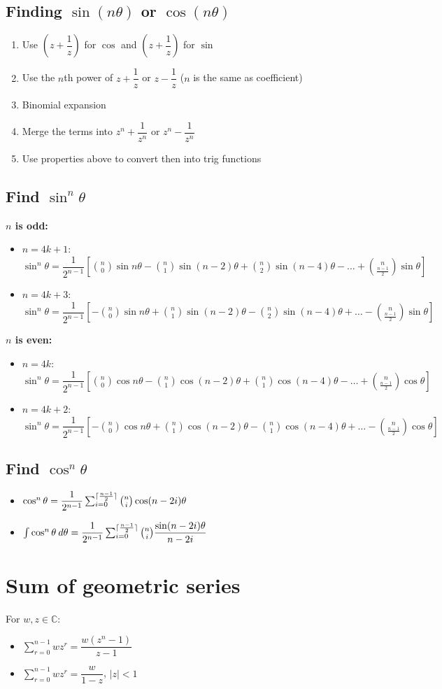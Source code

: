 \subsection{Finding $\sin (n\theta)$ or $\cos (n\theta)$}
\begin{enumerate}
    \item Use $\left(z+\dfrac{1}{z}\right)$ for $\cos$ and $\left(z+\dfrac{1}{z}\right)$ for $\sin$
    \item Use the $n$th power of $z+\dfrac{1}{z}$ or $z-\dfrac{1}{z}$ ($n$ is the same as coefficient)
    \item Binomial expansion
    \item Merge the terms into $z^n+\dfrac{1}{z^n}$ or $z^n-\dfrac{1}{z^n}$
    \item Use properties above to convert then into trig functions
\end{enumerate}
\subsection{Find $\sin^n\theta$}
\textbf{$n$ is odd:}
\begin{itemize}
    \item $n=4k+1$: $\sin^n\theta=\dfrac{1}{2^{n-1}}\left[\binom{n}{0}\sin n\theta - \binom{n}{1}\sin (n-2)\theta + \binom{n}{2}\sin (n-4)\theta - \dots + \binom{n}{\frac{n-1}{2}}\sin \theta\right]$
    \item $n=4k+3$: $\sin^n\theta=\dfrac{1}{2^{n-1}}\left[-\binom{n}{0}\sin n\theta + \binom{n}{1}\sin (n-2)\theta - \binom{n}{2}\sin (n-4)\theta + \dots - \binom{n}{\frac{n-1}{2}}\sin \theta\right]$
\end{itemize}
\textbf{$n$ is even:}
\begin{itemize}
    \item $n=4k$: $\sin^n\theta=\dfrac{1}{2^{n-1}}\left[\binom{n}{0}\cos n\theta - \binom{n}{1}\cos (n-2)\theta + \binom{n}{1}\cos (n-4)\theta - \dots + \binom{n}{\frac{n-1}{2}}\cos \theta\right]$
    \item $n=4k+2$: $\sin^n\theta=\dfrac{1}{2^{n-1}}\left[-\binom{n}{0}\cos n\theta + \binom{n}{1}\cos (n-2)\theta - \binom{n}{1}\cos (n-4)\theta + \dots - \binom{n}{\frac{n-1}{2}}\cos \theta\right]$
\end{itemize}
\subsection{Find $\cos^n\theta$}
\begin{itemize}
    \item $\cos^n\theta = \dfrac{1}{2^{n-1}}\sum_{i=0}^{\lceil\frac{n-1}{2}\rceil} \binom{n}{i}\cos (n-2i)\theta$
    \item $\int \cos^n\theta \: d\theta = \dfrac{1}{2^{n-1}} \sum_{i=0}^{\lceil\frac{n-1}{2}\rceil} \binom{n}{i} \dfrac{\sin (n-2i)\theta}{n-2i}$
\end{itemize}

\section{Sum of geometric series}
For $w, z \in \mathbb{C}$:
\begin{itemize}
    \item $\sum\limits_{r=0}^{n-1}wz^r=\dfrac{w(z^n-1)}{z-1}$
    \item $\sum\limits_{r=0}^{n-1}wz^r=\dfrac{w}{1-z}$, $|z|<1$
\end{itemize}

